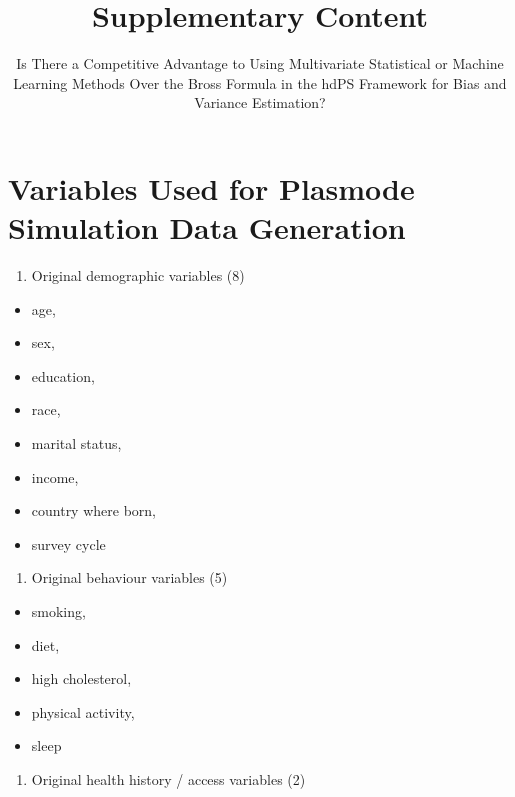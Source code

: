 \documentclass[
  10pt,
]{article}
\title{Supplementary Content}
\subtitle{Is There a Competitive Advantage to Using Multivariate
Statistical or Machine Learning Methods Over the Bross Formula in the
hdPS Framework for Bias and Variance Estimation?}
\author{}
\date{\vspace{-2.5em}}
\providecommand{\tightlist}{%
  \setlength{\itemsep}{0pt}\setlength{\parskip}{0pt}}
\begin{document}
\maketitle

\appendix
{}

\edef\tablename{\appendixname~\tablename}
\edef\figurename{\appendixname~\figurename}

\section{Variables Used for Plasmode Simulation Data
Generation}\label{variables-used-for-plasmode-simulation-data-generation}

\begin{enumerate}
\def\labelenumi{\arabic{enumi}.}
\tightlist
\item
  Original demographic variables (8)
\end{enumerate}

\begin{itemize}
\tightlist
\item
  age,
\item
  sex,
\item
  education,
\item
  race,
\item
  marital status,
\item
  income,
\item
  country where born,
\item
  survey cycle
\end{itemize}

\begin{enumerate}
\def\labelenumi{\arabic{enumi}.}
\setcounter{enumi}{1}
\tightlist
\item
  Original behaviour variables (5)
\end{enumerate}

\begin{itemize}
\tightlist
\item
  smoking,
\item
  diet,
\item
  high cholesterol,
\item
  physical activity,
\item
  sleep
\end{itemize}

\begin{enumerate}
\def\labelenumi{\arabic{enumi}.}
\setcounter{enumi}{2}
\tightlist
\item
  Original health history / access variables (2)
\end{enumerate}
\end{document}
